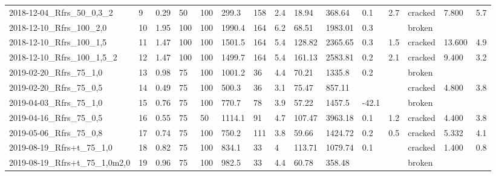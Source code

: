 \begin{tabular}{l l l l l l l l l l l l l l}
2018-12-04\_Rfrs\_50\_0,3\_2     &      9 &         0.29 &        50 &         100 &       299.3 &  158 &      2.4 &   18.94 &       368.64 &          0.1 &               2.7 &        cracked &      7.800 &           5.7 \\
2018-12-10\_Rfrs\_100\_2,0      &     10 &         1.95 &       100 &         100 &      1990.4 &  164 &      6.2 &   68.51 &      1983.01 &          0.3 &                   &         broken &            &               \\
2018-12-10\_Rfrs\_100\_1,5      &     11 &         1.47 &       100 &         100 &      1501.5 &  164 &      5.4 &  128.82 &      2365.65 &          0.3 &               1.5 &        cracked &     13.600 &           4.9 \\
2018-12-10\_Rfrs\_100\_1,5\_2    &     12 &         1.47 &       100 &         100 &      1499.7 &  164 &      5.4 &  161.13 &      2583.81 &          0.2 &               2.1 &        cracked &      9.400 &           3.2 \\
2019-02-20\_Rfrs\_75\_1,0       &     13 &         0.98 &        75 &         100 &      1001.2 &   36 &      4.4 &   70.21 &       1335.8 &          0.2 &                   &         broken &            &               \\
2019-02-20\_Rfrs\_75\_0,5       &     14 &         0.49 &        75 &         100 &       500.3 &   36 &      3.1 &   75.47 &       857.11 &              &                   &        cracked &      4.800 &           3.8 \\
2019-04-03\_Rfrs\_75\_1,0       &     15 &         0.76 &        75 &         100 &       770.7 &   78 &      3.9 &   57.22 &       1457.5 &        -42.1 &                   &         broken &            &               \\
2019-04-16\_Rfrs\_75\_0,5       &     16 &         0.55 &        75 &          50 &      1114.1 &   91 &      4.7 &  107.47 &      3963.18 &          0.1 &               1.2 &        cracked &      4.400 &           3.8 \\
2019-05-06\_Rfrs\_75\_0,8       &     17 &         0.74 &        75 &         100 &       750.2 &  111 &      3.8 &   59.66 &      1424.72 &          0.2 &               0.5 &        cracked &      5.332 &           4.1 \\
2019-08-19\_Rfrs+t\_75\_1,0     &     18 &         0.82 &        75 &         100 &       834.1 &   33 &        4 &  113.71 &      1079.74 &          0.1 &                   &        cracked &      1.400 &           0.8 \\
2019-08-19\_Rfrs+t\_75\_1,0m2,0 &     19 &         0.96 &        75 &         100 &       982.5 &   33 &      4.4 &   60.78 &       358.48 &              &                   &         broken &            &               \\
\bottomrule
\end{tabular}
